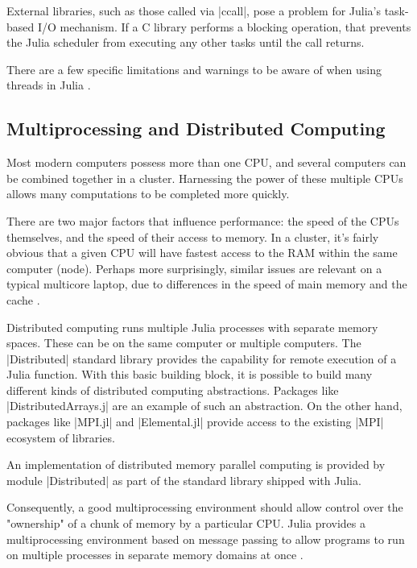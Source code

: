External libraries, such as those called via |ccall|, pose a problem for Julia's task-based I/O mechanism. If a C library performs a blocking operation, that prevents the Julia scheduler from executing any other tasks until the call returns.

There are a few specific limitations and warnings to be aware of when using threads in Julia \cite{julia:multithreading}.



\subsection{Multiprocessing and Distributed Computing}
\label{subsec:2:style}

Most modern computers possess more than one CPU, and several computers can be combined together in a cluster. Harnessing the power of these multiple CPUs allows many computations to be completed more quickly.

There are two major factors that influence performance: the speed of the CPUs themselves, and the speed of their access to memory. In a cluster, it's fairly obvious that a given CPU will have fastest access to the RAM within the same computer (node). Perhaps more surprisingly, similar issues are relevant on a typical multicore laptop, due to differences in the speed of main memory and the cache \cite{julia:DistributedComputing}.


Distributed computing runs multiple Julia processes with separate memory spaces. These can be on the same computer or multiple computers. The |Distributed| standard library provides the capability for remote execution of a Julia function. With this basic building block, it is possible to build many different kinds of distributed computing abstractions. Packages like |DistributedArrays.j| are an example of such an abstraction. On the other hand, packages like |MPI.jl| and |Elemental.jl| provide access to the existing |MPI| ecosystem of libraries.

An implementation of distributed memory parallel computing is provided by module |Distributed| as part of the standard library shipped with Julia.

Consequently, a good multiprocessing environment should allow control over the "ownership" of a chunk of memory by a particular CPU. Julia provides a multiprocessing environment based on message passing to allow programs to run on multiple processes in separate memory domains at once \cite{julia:DistributedComputing}.



